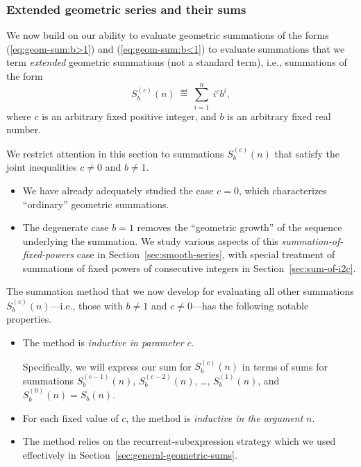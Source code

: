\subsubsection{Extended geometric series and their sums}
\label{sec:extended-geom-series}

We now build on our ability to evaluate geometric summations of the forms (\ref{eq:geom-sum:b>1}) and (\ref{eq:geom-sum:b<1}) to evaluate summations that we term {\em extended} geometric summations (not a standard term), i.e., summations of the form
\[ S_b^{(c)}(n) \ \eqdef \ \sum_{i=1}^n \ i^c b^i, \]
where $c$ is an arbitrary fixed positive integer, and $b$ is an arbitrary fixed real number.

\smallskip

We restrict attention in this section to summations $S_b^{(c)}(n)$ that satisfy the joint inequalities $c \neq 0$ and $b \neq 1$.

\medskip

\begin{itemize}
\item
We have already adequately studied the case $c=0$, which characterizes ``ordinary'' geometric summations.
\medskip\item
The degenerate case $b = 1$ removes the ``geometric growth'' of the sequence underlying the summation.  We study various aspects of this {\it summation-of-fixed-powers} case in Section~\ref{sec:smooth-series}, with special treatment of summations of fixed powers of consecutive integers in Section~\ref{sec:sum-of-i2c}.
\end{itemize}

\medskip

The summation method that we now develop for evaluating all other summations $S_b^{(c)}(n)$---i.e., those with $b \neq 1$ and $c \neq 0$---has the following notable properties.
\begin{itemize}
\item
The method is {\em inductive in parameter} $c$.

\smallskip

Specifically, we will express our sum for $S_b^{(c)}(n)$ in terms of sums for summations $S_b^{(c-1)}(n)$, $S_b^{(c-2)}(n)$, \ldots, $S_b^{(1)}(n)$, and $S_b^{(0)}(n) = S_b(n)$.

\medskip\item
For each fixed value of $c$, the method is {\em inductive in the argument} $n$.

\medskip\item
The method relies on the recurrent-subexpression strategy which we used effectively in Section~\ref{sec:general-geometric-sums}.
\end{itemize}

